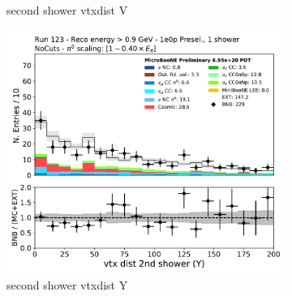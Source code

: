 \begin{figure}[H]
\begin{subfigure}{0.3\textwidth}
    \caption{second shower vtxdist V}
    \end{subfigure}
    \begin{subfigure}{0.3\textwidth}
    \includegraphics[width=1.0\textwidth]{1e0p/High_E_Sideband/secondshower_Y_vtxdist.pdf}
    \caption{second shower vtxdist Y}
    \end{subfigure}
    \caption{} 
    \label{fig:HE_1eNp_1}
\end{figure}

